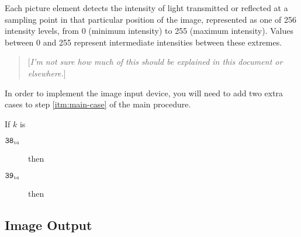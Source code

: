 \documentclass[a4paper,12pt]{article}
\newcommand{\num}[1]{\texttt{#1}}
\newcommand{\hex}[1]{\num{#1}_{\textup{\tiny 16}}}
\newcommand{\proc}[1]{\textsc{#1}}
\newcommand{\comment}[1]{\begin{quote}[\textit{#1}]\end{quote}}
\newcommand{\op}[1]{$#1$}
\newcommand{\READFRAME} [1]{\op{\hex{38}}}
\newcommand{\READPIXEL} [1]{\op{\hex{39}}}
\begin{document}
Each picture element detects the intensity of light transmitted or reflected at a sampling point in that particular position of the image, represented as one of 256 intensity levels, from 0 (minimum intensity) to 255 (maximum intensity).
Values between 0 and 255 represent intermediate intensities between these extremes.

\comment{I'm not sure how much of this should be explained in this document or elsewhere.}

In order to implement the image input device, you will need to add two extra cases to step \ref{itm:main-case} of the main procedure.

\begin{stepnumbers}[start=3]
\item If $k$ is
  \begin{description}
  \item[\READFRAME{}] then
  \item[\READPIXEL{}] then
  \end{description}
\end{stepnumbers}

\subsection{Image Output}
\end{document}
